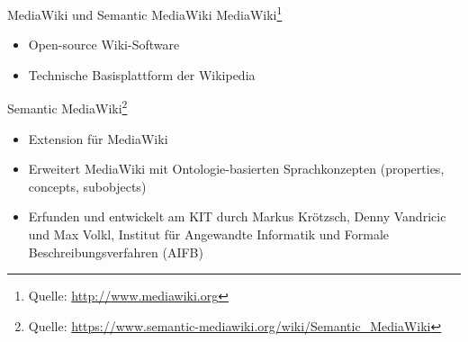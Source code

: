 \documentclass[aspectratio=1610,onlymath]{beamer}
\begin{document}
\begin{frame}{MediaWiki und Semantic MediaWiki}
	\alert{MediaWiki}\footnote{Quelle: \url{http://www.mediawiki.org}}
	\begin{itemize}
		\item Open-source Wiki-Software
		\item Technische Basisplattform der Wikipedia
	\end{itemize}
	\bigskip
	
	\alert{Semantic MediaWiki}\footnote{Quelle: \url{https://www.semantic-mediawiki.org/wiki/Semantic_MediaWiki}}
	\begin{itemize}
		\item Extension für MediaWiki
		\item Erweitert MediaWiki mit Ontologie-basierten Sprachkonzepten (\alert{properties}, \alert{concepts}, \alert{subobjects})
		\item Erfunden und entwickelt am KIT durch Markus Krötzsch, Denny Vandricic und Max Volkl, Institut für Angewandte Informatik und Formale Beschreibungsverfahren (AIFB)
	\end{itemize}
	
\end{frame}
\end{document}
